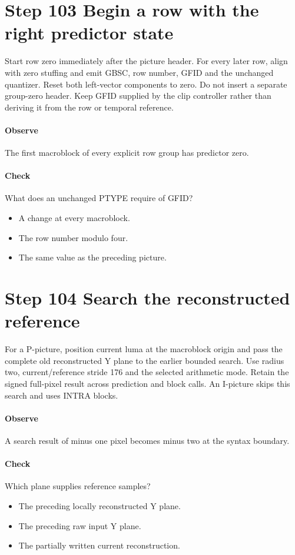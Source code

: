 \section{Step 103 Begin a row with the right predictor state}\label{h263-picture-s03}
Start row zero immediately after the picture header. For every later row, align
with zero stuffing and emit GBSC, row number, GFID and the unchanged quantizer.
Reset both left-vector components to zero. Do not insert a separate group-zero
header. Keep GFID supplied by the clip controller rather than deriving it from
the row or temporal reference.

\paragraph{Observe} The first macroblock of every explicit row group has predictor zero.
\paragraph{Check} What does an unchanged PTYPE require of GFID?
\begin{itemize}
  \item[A.] A change at every macroblock.
  \item[B.] The row number modulo four.
  \item[C.] The same value as the preceding picture.
\end{itemize}

\section{Step 104 Search the reconstructed reference}\label{h263-picture-s04}
For a P-picture, position current luma at the macroblock origin and pass the
complete old reconstructed Y plane to the earlier bounded search. Use radius two,
current/reference stride 176 and the selected arithmetic mode. Retain the signed
full-pixel result across prediction and block calls. An I-picture skips this
search and uses INTRA blocks.

\paragraph{Observe} A search result of minus one pixel becomes minus two at the syntax boundary.
\paragraph{Check} Which plane supplies reference samples?
\begin{itemize}
  \item[A.] The preceding locally reconstructed Y plane.
  \item[B.] The preceding raw input Y plane.
  \item[C.] The partially written current reconstruction.
\end{itemize}

